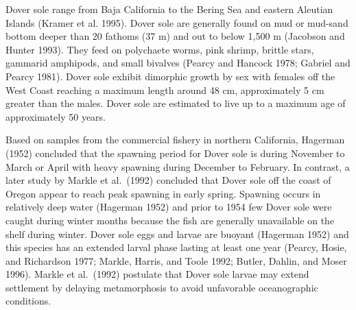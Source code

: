 \documentclass[11pt,
  english,
  a4paper,
]{article}
\begin{document}

Dover sole range from Baja California to the Bering Sea and eastern Aleutian Islands {(Kramer et al. 1995)\leavevmode\tagmcend\tagstructend}. Dover sole are generally found on mud or mud-sand bottom deeper than 20 fathoms (37 m) and out to below 1,500 m {(Jacobson and Hunter 1993)\leavevmode\tagmcend\tagstructend}. They feed on polychaete worms, pink shrimp, brittle stars, gammarid amphipods, and small bivalves {(Pearcy and Hancock 1978; Gabriel and Pearcy 1981)\leavevmode\tagmcend\tagstructend}. Dover sole exhibit dimorphic growth by sex with females off the West Coast reaching a maximum length around 48 cm, approximately 5 cm greater than the males. Dover sole are estimated to live up to a maximum age of approximately 50 years.

\leavevmode\tagmcend\tagstructend\par


Based on samples from the commercial fishery in northern California, Hagerman {(1952)\leavevmode\tagmcend\tagstructend} concluded that the spawning period for Dover sole is during November to March or April with heavy spawning during December to February. In contrast, a later study by Markle et al.~{(1992)\leavevmode\tagmcend\tagstructend} concluded that Dover sole off the coast of Oregon appear to reach peak spawning in early spring. Spawning occurs in relatively deep water {(Hagerman 1952)\leavevmode\tagmcend\tagstructend} and prior to 1954 few Dover sole were caught during winter months because the fish are generally unavailable on the shelf during winter. Dover sole eggs and larvae are buoyant {(Hagerman 1952)\leavevmode\tagmcend\tagstructend} and this species has an extended larval phase lasting at least one year {(Pearcy, Hosie, and Richardson 1977; Markle, Harris, and Toole 1992; Butler, Dahlin, and Moser 1996)\leavevmode\tagmcend\tagstructend}. Markle et al.~{(1992)\leavevmode\tagmcend\tagstructend} postulate that Dover sole larvae may extend settlement by delaying metamorphosis to avoid unfavorable oceanographic conditions.
\end{document}
